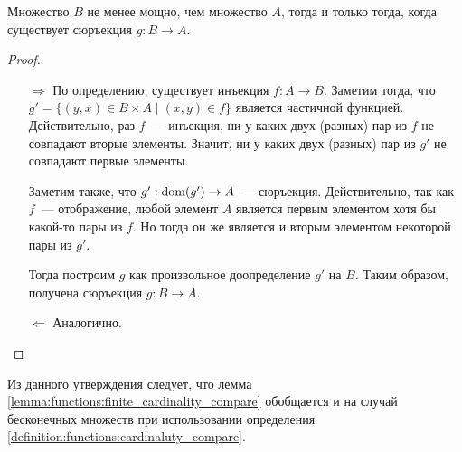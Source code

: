 
\begin{statement}
    \label{statement:functions:cardinality_compare_equivalence}
    Множество $ B $ не менее мощно, чем множество $ A $, тогда и только тогда, когда существует сюръекция $ g: B \to A $.
\end{statement}

\begin{proof}
    \begin{enumerate}
        \item[]
        \item[$\Rightarrow$]
            По определению, существует инъекция $ f: A \to B $.
            Заметим тогда, что $ g' = \{ (y, x) \in B \times A \mid (x, y) \in f \} $ является частичной функцией.
            Действительно, раз $ f $~--- инъекция, ни у каких двух (разных) пар из $ f $ не совпадают вторые элементы.
            Значит, ни у каких двух (разных) пар из $ g' $ не совпадают первые элементы.

            Заметим также, что $ g': \operatorname*{\textnormal{dom}}(g') \to A $~--- сюръекция.
            Действительно, так как $ f $~--- отображение, любой элемент $ A $ является первым элементом хотя бы какой-то пары из $ f $.
            Но тогда он же является и вторым элементом некоторой пары из $ g' $.

            Тогда построим $ g $ как произвольное доопределение $ g' $ на $ B $.
            Таким образом, получена сюръекция $ g: B \to A $.
        \item[$\Leftarrow$]
            Аналогично.
    \end{enumerate}
\end{proof}

Из данного утверждения следует, что лемма \ref{lemma:functions:finite_cardinality_compare}
обобщается и на случай бесконечных множеств при использовании определения \ref{definition:functions:cardinaluty_compare}.
